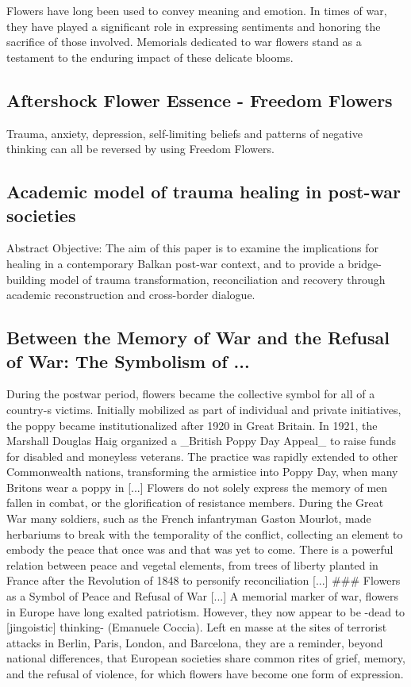 \documentclass[12pt]{article}
\begin{document}
Flowers have long been used to convey meaning and emotion. In times of war, they have played a significant role in expressing sentiments and honoring the sacrifice of those involved. Memorials dedicated to war flowers stand as a testament to the enduring impact of these delicate blooms.\subsection{Aftershock Flower Essence - Freedom Flowers}
Trauma, anxiety, depression, self-limiting beliefs and patterns of negative thinking can all be reversed by using Freedom Flowers.\subsection{Academic model of trauma healing in post-war societies}
Abstract Objective: The aim of this paper is to examine the implications for healing in a contemporary Balkan post-war context, and to provide a bridge-building model of trauma transformation, reconciliation and recovery through academic reconstruction and cross-border dialogue.\subsection{Between the Memory of War and the Refusal of War: The Symbolism of ...}
During the postwar period, flowers became the collective symbol for all of a country-s victims. Initially mobilized as part of individual and private initiatives, the poppy became institutionalized after 1920 in Great Britain. In 1921, the Marshall Douglas Haig organized a \_British Poppy Day Appeal\_ to raise funds for disabled and moneyless veterans. The practice was rapidly extended to other Commonwealth nations, transforming the armistice into Poppy Day, when many Britons wear a poppy in [...] Flowers do not solely express the memory of men fallen in combat, or the glorification of resistance members. During the Great War many soldiers, such as the French infantryman Gaston Mourlot, made herbariums to break with the temporality of the conflict, collecting an element to embody the peace that once was and that was yet to come. There is a powerful relation between peace and vegetal elements, from trees of liberty planted in France after the Revolution of 1848 to personify reconciliation [...] \#\#\# Flowers as a Symbol of Peace and Refusal of War [...] A memorial marker of war, flowers in Europe have long exalted patriotism. However, they now appear to be -dead to [jingoistic] thinking- (Emanuele Coccia). Left en masse at the sites of terrorist attacks in Berlin, Paris, London, and Barcelona, they are a reminder, beyond national differences, that European societies share common rites of grief, memory, and the refusal of violence, for which flowers have become one form of expression.
\end{document}
